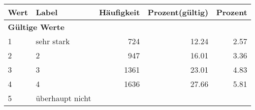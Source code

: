      \begin{longtable}{lXrrr}
     \toprule
     \textbf{Wert} & \textbf{Label} & \textbf{Häufigkeit} & \textbf{Prozent(gültig)} & \textbf{Prozent} \\
     \endhead
     \midrule
     \multicolumn{5}{l}{\textbf{Gültige Werte}}\\

     1 &
     \multicolumn{1}{X}{ sehr stark   } &


       \num{724} &
       \num[round-mode=places,round-precision=2]{12,24} &
         \num[round-mode=places,round-precision=2]{2,57} \\

     2 &
     \multicolumn{1}{X}{ 2   } &


       \num{947} &
       \num[round-mode=places,round-precision=2]{16,01} &
         \num[round-mode=places,round-precision=2]{3,36} \\

     3 &
     \multicolumn{1}{X}{ 3   } &


       \num{1361} &
       \num[round-mode=places,round-precision=2]{23,01} &
         \num[round-mode=places,round-precision=2]{4,83} \\

     4 &
     \multicolumn{1}{X}{ 4   } &


       \num{1636} &
       \num[round-mode=places,round-precision=2]{27,66} &
         \num[round-mode=places,round-precision=2]{5,81} \\

     5 &
     \multicolumn{1}{X}{ überhaupt nicht   } &



\end{longtable}
